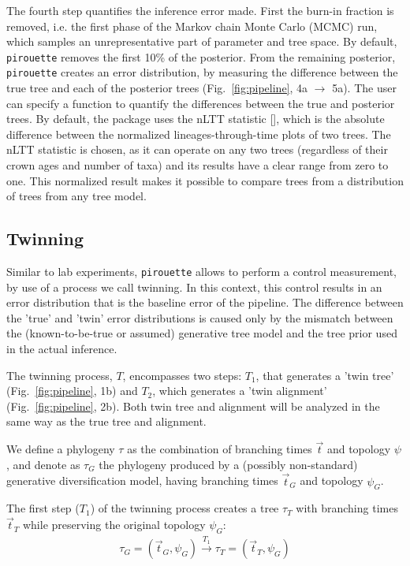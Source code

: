 The fourth step quantifies the inference error made. 
First the burn-in fraction is removed, i.e. the first phase of the 
Markov chain Monte Carlo (MCMC) run,
which samples an unrepresentative part of parameter and tree space. 
By default, \verb;pirouette; 
removes the first 10\% of the posterior.
From the remaining posterior, \verb;pirouette; 
creates an error distribution, by measuring the difference
between the true tree and each of the posterior 
trees (Fig.~\ref{fig:pipeline}, 4a $\rightarrow$ 5a).
The user can specify a function to quantify the differences between
the true and posterior trees. By default, the package uses the nLTT 
statistic [\cite{janzen2015approximate}], which is the absolute difference
between the normalized lineages-through-time plots of two trees.
The nLTT statistic is chosen, as it can operate on any two trees (regardless
of their crown ages and number of taxa) and its results have a clear range
from zero to one. This normalized result makes it possible to compare trees 
from a distribution of trees from any tree model.

\subsection{Twinning}\label{subsec:twinning}

Similar to lab experiments, \verb;pirouette; allows to perform
a control measurement, by use of a process we call twinning. 
In this context, this control results in an error distribution
that is the baseline error of the pipeline. The difference
between the 'true' and 'twin' error distributions is caused only
by the mismatch between the (known-to-be-true or assumed) 
generative tree model and the 
tree prior used in the actual inference.

The twinning process, $T$, encompasses two steps:
$T_1$, that generates a 'twin tree' (Fig.~\ref{fig:pipeline}, 1b) 
and $T_2$, which generates a 'twin alignment' (Fig.~\ref{fig:pipeline}, 2b).
Both twin tree and alignment will be analyzed in the same way 
as the true tree and alignment.

We define a phylogeny $\tau$ as the combination of
branching times $\Vec{t}$ and topology $\psi$, 
and denote as $\tau_{\mathit{G}}$ the phylogeny 
produced by a (possibly non-standard) generative diversification model, 
having branching times $\Vec{t}_{\mathit{G}}$ and 
topology $\psi_{\mathit{G}}$.

The first step ($T_1$) of the twinning process creates a tree $\tau_{\mathit{T}}$
with branching times $\Vec{t}_{\mathit{T}}$ while preserving the original
topology $\psi_{\mathit{G}}$:
\begin{align}
  \tau_{\mathit{G}} = (\Vec{t}_{\mathit{G}}, \psi_{\mathit{G}}) 
  \xrightarrow[]{\mathit{T_1}} 
  \tau_{\mathit{T}} = (\Vec{t}_{\mathit{T}}, \psi_{\mathit{G}})
\end{align}

